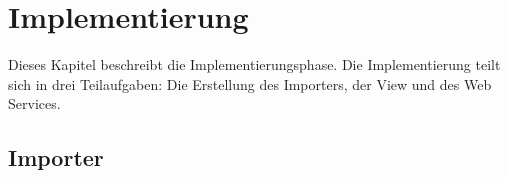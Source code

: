 \chapter{Implementierung}

Dieses Kapitel beschreibt die Implementierungsphase. Die Implementierung teilt sich in drei Teilaufgaben: Die Erstellung des Importers, der View und des Web Services. 

\section{Importer}  \label{implementierung}